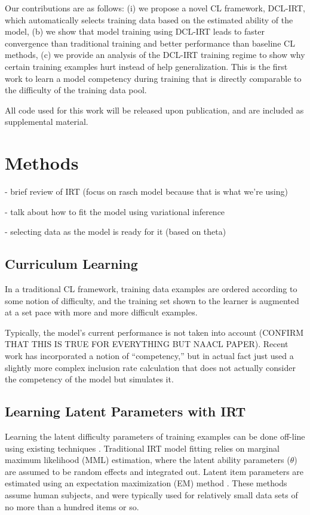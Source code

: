 \documentclass[letterpaper]{article} %
\begin{document}
Our contributions are as follows: (i) we propose a novel CL framework, DCL-IRT, which automatically selects training data based on the estimated ability of the model, (b) we show that model training using DCL-IRT leads to faster convergence than traditional training and better performance than baseline CL methods, (c) we provide an analysis of the DCL-IRT training regime to show why certain training examples hurt instead of help generalization.
This is the first work to learn a model competency during training that is directly comparable to the difficulty of the training data pool.

All code used for this work will be released upon publication, and are included as supplemental material.

\section{Methods}

- brief review of IRT (focus on rasch model because that is what we're using)

- talk about how to fit the model using variational inference

- selecting data as the model is ready for it (based on theta)
\subsection{Curriculum Learning}
In a traditional CL framework, training data examples are ordered according to some notion of difficulty, and the training set shown to the learner is augmented at a set pace with more and more difficult examples.

Typically, the model's current performance is not taken into account (CONFIRM THAT THIS IS TRUE FOR EVERYTHING BUT NAACL PAPER). Recent work has incorporated a notion of ``competency,'' but in actual fact just used a slightly more complex inclusion rate calculation that does not actually consider the competency of the model but simulates it.

\subsection{Learning Latent Parameters with IRT}
Learning the latent difficulty parameters of training examples can be done off-line using existing techniques \cite{lalor_learning_2019}.
Traditional IRT model fitting relies on marginal maximum likelihood (MML) estimation, where the latent ability parameters ($\theta$) are assumed to be random effects and integrated out.
Latent item parameters are estimated using an expectation maximization (EM) method \cite{bock_marginal_1981}.
These methods assume human subjects, and were typically used for relatively small data sets of no more than a hundred items or so.
\end{document}
